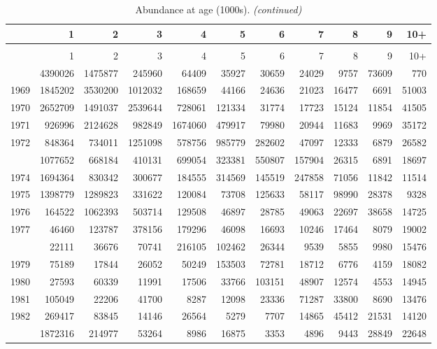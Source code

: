 \documentclass[
]{article}
\begin{document}
\begin{longtable}[t]{lrrrrrrrrrr}
\caption{\label{tab:NAA-table}Abundance at age (1000s).}\\
\toprule
  & 1 & 2 & 3 & 4 & 5 & 6 & 7 & 8 & 9 & 10+\\
\midrule
\endfirsthead
\caption[]{Abundance at age (1000s). \textit{(continued)}}\\
\toprule
  & 1 & 2 & 3 & 4 & 5 & 6 & 7 & 8 & 9 & 10+\\
\midrule
\endhead

\endfoot
\bottomrule
\endlastfoot
1968 & 4390026 & 1475877 & 245960 & 64409 & 35927 & 30659 & 24029 & 9757 & 73609 & 770\\
1969 & 1845202 & 3530200 & 1012032 & 168659 & 44166 & 24636 & 21023 & 16477 & 6691 & 51003\\
1970 & 2652709 & 1491037 & 2539644 & 728061 & 121334 & 31774 & 17723 & 15124 & 11854 & 41505\\
1971 & 926996 & 2124628 & 982849 & 1674060 & 479917 & 79980 & 20944 & 11683 & 9969 & 35172\\
1972 & 848364 & 734011 & 1251098 & 578756 & 985779 & 282602 & 47097 & 12333 & 6879 & 26582\\
\addlinespace
1973 & 1077652 & 668184 & 410131 & 699054 & 323381 & 550807 & 157904 & 26315 & 6891 & 18697\\
1974 & 1694364 & 830342 & 300677 & 184555 & 314569 & 145519 & 247858 & 71056 & 11842 & 11514\\
1975 & 1398779 & 1289823 & 331622 & 120084 & 73708 & 125633 & 58117 & 98990 & 28378 & 9328\\
1976 & 164522 & 1062393 & 503714 & 129508 & 46897 & 28785 & 49063 & 22697 & 38658 & 14725\\
1977 & 46460 & 123787 & 378156 & 179296 & 46098 & 16693 & 10246 & 17464 & 8079 & 19002\\
\addlinespace
1978 & 22111 & 36676 & 70741 & 216105 & 102462 & 26344 & 9539 & 5855 & 9980 & 15476\\
1979 & 75189 & 17844 & 26052 & 50249 & 153503 & 72781 & 18712 & 6776 & 4159 & 18082\\
1980 & 27593 & 60339 & 11991 & 17506 & 33766 & 103151 & 48907 & 12574 & 4553 & 14945\\
1981 & 105049 & 22206 & 41700 & 8287 & 12098 & 23336 & 71287 & 33800 & 8690 & 13476\\
1982 & 269417 & 83845 & 14146 & 26564 & 5279 & 7707 & 14865 & 45412 & 21531 & 14120\\
\addlinespace
1983 & 1872316 & 214977 & 53264 & 8986 & 16875 & 3353 & 4896 & 9443 & 28849 & 22648\\

\end{longtable}
\end{document}
